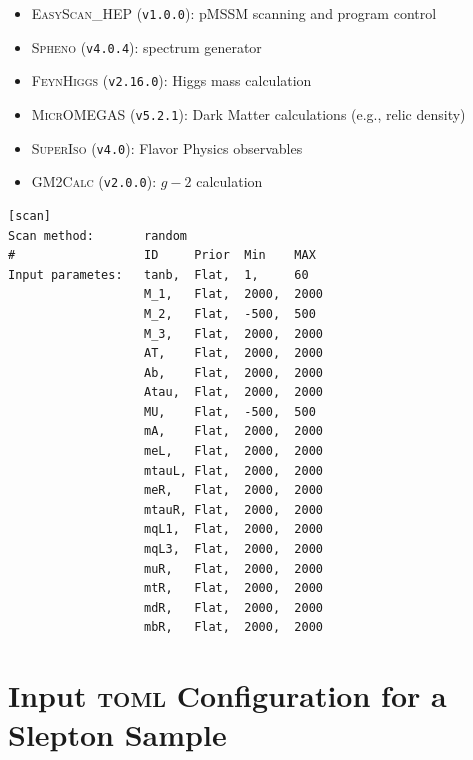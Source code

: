\documentclass{article}
\newcommand{\easyscanhep}{\textsc{EasyScan\_HEP}}
\newcommand{\spheno}{\textsc{Spheno}}
\newcommand{\feynhiggs}{\textsc{FeynHiggs}}
\newcommand{\micromegas}{\textsc{MicrOMEGAS}}
\newcommand{\superiso}{\textsc{SuperIso}}
\newcommand{\gmtwocalc}{\textsc{GM2Calc}}
\newcommand{\toml}{\textsc{toml}}
\begin{document}
\begin{itemize}
	\item \easyscanhep{} (\texttt{v1.0.0}): pMSSM scanning and program control~\cite{Shang:2023gfy,Han:2016gvr}
	\item \spheno{} (\texttt{v4.0.4}): spectrum generator~\cite{Porod:2003um,Porod:2011nf}
	\item \feynhiggs{} (\texttt{v2.16.0}): Higgs mass calculation~\cite{Bahl:2018qog,Bahl:2017aev,Bahl:2016brp,Hahn:2013ria,Frank:2006yh,Degrassi:2002fi,Heinemeyer:1998np,Heinemeyer:1998yj}
	\item \micromegas{} (\texttt{v5.2.1}): Dark Matter calculations (e.g., relic density)~\cite{Belanger:2020gnr}
	\item \superiso{} (\texttt{v4.0}): Flavor Physics observables~\cite{Arbey:2018msw}
	\item \gmtwocalc{} (\texttt{v2.0.0}): $g-2$ calculation~\cite{Athron:2015rva,Athron:2021evk}
\end{itemize}

\begin{listing}[H]
	\begin{verbatim}
[scan]
Scan method:       random
#                  ID     Prior  Min    MAX
Input parametes:   tanb,  Flat,  1,     60
                   M_1,   Flat,  2000,  2000
                   M_2,   Flat,  -500,  500
                   M_3,   Flat,  2000,  2000
                   AT,    Flat,  2000,  2000
                   Ab,    Flat,  2000,  2000
                   Atau,  Flat,  2000,  2000
                   MU,    Flat,  -500,  500
                   mA,    Flat,  2000,  2000
                   meL,   Flat,  2000,  2000
                   mtauL, Flat,  2000,  2000
                   meR,   Flat,  2000,  2000
                   mtauR, Flat,  2000,  2000
                   mqL1,  Flat,  2000,  2000
                   mqL3,  Flat,  2000,  2000
                   muR,   Flat,  2000,  2000
                   mtR,   Flat,  2000,  2000
                   mdR,   Flat,  2000,  2000
                   mbR,   Flat,  2000,  2000
  \end{verbatim}
	\caption{A portion of the \texttt{easyscan.ini} configuration defining the random sampling for the electroweakinos scan.}
	\label{lst:easyscanini}
\end{listing}

\section{Input \toml{} Configuration for a Slepton Sample}
\label{sec:input-configuration-for-a-slepton-sample}
\end{document}
